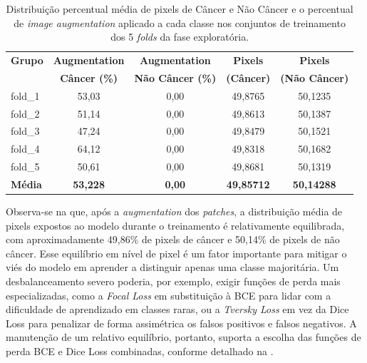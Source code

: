 
\begin{table}[!htb]
\centering
\caption[Distribuição de pixels e percentual de augmentation por fold.]{Distribuição percentual média de pixels de Câncer e Não Câncer e o percentual de \textit{image augmentation} aplicado a cada classe nos conjuntos de treinamento dos 5 \textit{folds} da fase exploratória.}
\label{tab:distribuicao_pixels_augmentation_folds}
\begin{tabular}{l S[table-format=2.2] S[table-format=2.2] S[table-format=2.4] S[table-format=2.4]}
\toprule
\textbf{Grupo} & {\textbf{Augmentation}} & {\textbf{Augmentation}} & {\textbf{Pixels}} & {\textbf{Pixels}} \\
               & {\textbf{Câncer (\%)}} & {\textbf{Não Câncer (\%)}} & {\textbf{(Câncer)}} & {\textbf{(Não Câncer)}} \\
\midrule
fold\_1 & 53,03 & 0,00 & 49,8765 & 50,1235 \\
fold\_2 & 51,14 & 0,00 & 49,8613 & 50,1387 \\
fold\_3 & 47,24 & 0,00 & 49,8479 & 50,1521 \\
fold\_4 & 64,12 & 0,00 & 49,8318 & 50,1682 \\
fold\_5 & 50,61 & 0,00 & 49,8681 & 50,1319 \\
\midrule
{} %
\textbf{Média} & \textbf{53,228} & \textbf{0,00} & \textbf{49,85712} & \textbf{50,14288} \\
\bottomrule
\end{tabular}
\end{table}

Observa-se na  que, após a \textit{augmentation} dos \textit{patches}, a distribuição média de pixels expostos ao modelo durante o treinamento é relativamente equilibrada, com aproximadamente 49,86\% de pixels de câncer e 50,14\% de pixels de não câncer. Esse equilíbrio em nível de pixel é um fator importante para mitigar o viés do modelo em aprender a distinguir apenas uma classe majoritária. Um desbalanceamento severo poderia, por exemplo, exigir funções de perda mais especializadas, como a \textit{Focal Loss} \cite{Lin2017FocalLoss} em substituição à BCE para lidar com a dificuldade de aprendizado em classes raras, ou a \textit{Tversky Loss} \cite{Salehi2017Tversky} em vez da Dice Loss para penalizar de forma assimétrica os falsos positivos e falsos negativos. A manutenção de um relativo equilíbrio, portanto, suporta a escolha das funções de perda BCE e Dice Loss combinadas, conforme detalhado na .

